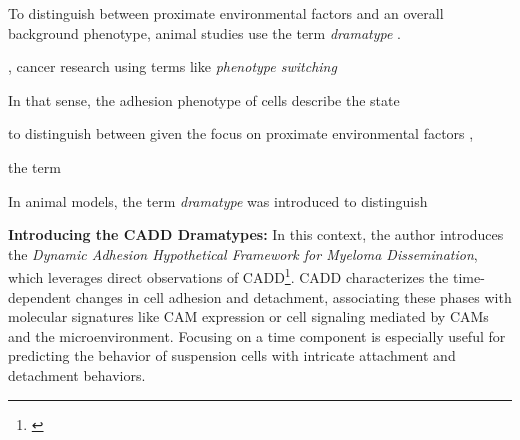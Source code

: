 To distinguish between proximate environmental factors
and an overall background phenotype, animal studies use the term
\emph{dramatype}
\cite{zutphenPrinciplesLaboratoryAnimal2001}.

, cancer research using terms like \textit{phenotype switching} \cite{woutersRobustGeneExpression2020}

In that sense, the adhesion phenotype of \INA cells describe the state


to distinguish between
given the focus on proximate environmental factors
,

the term

In animal models, the term \emph{dramatype} was introduced to distinguish



\textbf{Introducing the CADD Dramatypes:}
In this context, the author introduces the \emph{Dynamic Adhesion Hypothetical
      Framework for Myeloma Dissemination}, which leverages direct observations of
\acf{CADD}\footnote{\footcadd\label{foot:cadd}}. \ac{CADD} characterizes the
time-dependent changes in cell adhesion and detachment, associating these phases
with molecular signatures like \ac{CAM} expression or cell signaling mediated by
\acp{CAM} and the microenvironment. Focusing on a time component is especially
useful for predicting the behavior of suspension cells with intricate attachment
and detachment behaviors.



\newcommand{\caddadaptation}{ %
      \ac{CADD} is adapted in response to different microenvironments faced
      during dissemination %
}
\newcommand{\caddadaptationtitle}{ %
      \textit{Hypothesis 1}: \acl{CADD} (\acs{CADD}) is Adapted during Dissemination%
}%


\newcommand{\caddadaptibility}{ %
      Rapid of \ac{CADD} adaptability is a hallmark of aggressive myeloma %
}%
\newcommand{\caddadaptabilitytitle}{ %
      \textit{Hypothesis 2}: Rapid CADD Adaptability is a Hallmark of
      Aggressive Myeloma %
}%




\newcommand{\cadddiversity}{%
      \ac{CADD} is highly diverse within both patients and cell lines %
}%
\newcommand{\cadddiversitytitle}{ %
      \textit{Hypothesis 3}: CADD is Highly Diverse Within both Patients
      and Cell Lines%
}%


